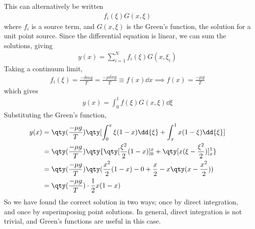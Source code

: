 This can alternatively be written
\begin{align*}
	f_i(\xi) G(x,\xi)
\end{align*}
where $f_i$ is a source term, and $G(x,\xi)$ is the Green's function, the solution for a unit point source.
Since the differential equation is linear, we can sum the solutions, giving
\begin{align*}
	y(x) = \sum_{i=1}^N f_i(\xi) G(x, \xi_i)
\end{align*}
Taking a continuum limit,
\begin{align*}
	f_i(\xi) = \frac{-\delta m g}{T} = \frac{-\mu \delta x g}{T} \equiv f(x) \dd{x} \implies f(x) = \frac{-\mu g}{T}
\end{align*}
which gives
\begin{align*}
	y(x) = \int_0^1 f(\xi) G(x,\xi) \dd{\xi}
\end{align*}
Substituting the Green's function,
\begin{align*}
	y(x) & = \qty(\frac{-\mu g}{T}) \qty[ \int_0^x \xi(1-x) \dd{\xi} + \int_x^1 x(1-\xi) \dd{\xi}] \\
    &= \qty(\frac{-\mu g}{T}) \qty{ \qty[\frac{\xi^2}{2}(1-x)]_0^x + \qty[x(\xi - \frac{\xi^2}{2})]_x^1 } \\
    &= \qty(\frac{-\mu g}{T}) \qty(\frac{x^2}{2}(1-x) - 0 + \frac{x}{2} - x\qty(x-\frac{x^2}{2}))  \\
    &= \qty(\frac{-\mu g}{T}) \cdot \frac{1}{2}x(1-x)
\end{align*}
So we have found the correct solution in two ways; once by direct integration, and once by superimposing point solutions.
In general, direct integration is not trivial, and Green's functions are useful in this case.


